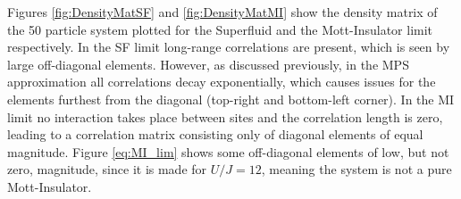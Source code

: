 Figures \ref{fig:DensityMatSF} and \ref{fig:DensityMatMI} show the density matrix of the 50 particle system plotted for the Superfluid and the Mott-Insulator limit respectively. In the SF limit long-range correlations are present, which is seen by large off-diagonal elements. However, as discussed previously, in the MPS approximation all correlations decay exponentially, which causes issues for the elements furthest from the diagonal (top-right and bottom-left corner). In the MI limit no interaction takes place between sites and the correlation length is zero,  leading to a correlation matrix consisting only of diagonal elements of equal magnitude. Figure \ref{eq:MI_lim} shows some off-diagonal elements of low, but not zero, magnitude, since it is made for $U/J = 12$, meaning the system is not a pure Mott-Insulator.
